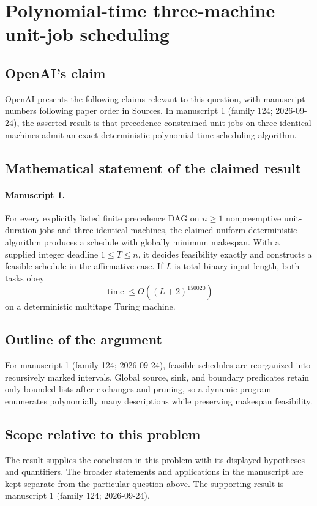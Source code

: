 \documentclass[11pt]{article}
\begin{document}
\section*{Polynomial-time three-machine unit-job scheduling}

\subsection{OpenAI's claim}
OpenAI presents the following claims relevant to this question, with manuscript numbers following paper order in Sources. In manuscript 1 (family 124; 2026-09-24), the asserted result is that precedence-constrained unit jobs on three identical machines admit an exact deterministic polynomial-time scheduling algorithm.

\subsection{Mathematical statement of the claimed result}
\paragraph{Manuscript 1.}
For every explicitly listed finite precedence DAG on $n\ge1$ nonpreemptive unit-duration jobs and three identical machines, the claimed uniform deterministic algorithm produces a schedule with globally minimum makespan. With a supplied integer deadline $1\le T\le n$, it decides feasibility exactly and constructs a feasible schedule in the affirmative case. If $L$ is total binary input length, both tasks obey
\[
 \operatorname{time}\le O((L+2)^{150020})
\]
on a deterministic multitape Turing machine.

\subsection{Outline of the argument}
For manuscript 1 (family 124; 2026-09-24), feasible schedules are reorganized into recursively marked intervals. Global source, sink, and boundary predicates retain only bounded lists after exchanges and pruning, so a dynamic program enumerates polynomially many descriptions while preserving makespan feasibility.

\subsection{Scope relative to this problem}
The result supplies the conclusion in this problem with its displayed hypotheses and quantifiers. The broader statements and applications in the manuscript are kept separate from the particular question above. The supporting result is manuscript 1 (family 124; 2026-09-24).
\end{document}
